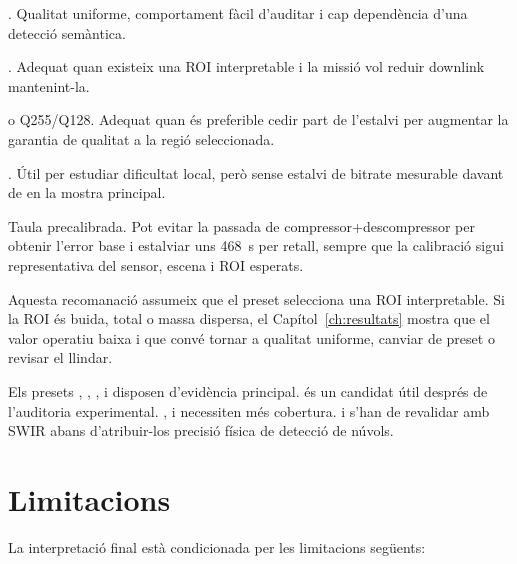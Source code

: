 \begin{description}[leftmargin=3.5cm,style=nextline]
  \item[Fallback robust] . Qualitat uniforme, comportament fàcil
  d'auditar i cap dependència d'una detecció semàntica.
  \item[Mode principal] . Adequat quan existeix
  una ROI interpretable i la missió vol reduir downlink mantenint-la.
  \item[ROI prioritària]  o Q255/Q128.
  Adequat quan és preferible cedir part de l'estalvi per augmentar la garantia
  de qualitat a la regió seleccionada.
  \item[Control tècnic] . Útil per estudiar dificultat local,
  però sense estalvi de bitrate mesurable davant de  en la mostra
  principal.
  \item[Baixa cadència o calibració coneguda] Taula precalibrada. Pot evitar la
  passada de compressor+descompressor per obtenir l'error base i estalviar uns
  468~s per retall, sempre que la calibració sigui representativa del sensor,
  escena i ROI esperats.
\end{description}

Aquesta recomanació assumeix que el preset selecciona una ROI interpretable. Si
la ROI és buida, total o massa dispersa, el Capítol~\ref{ch:resultats} mostra
que el valor operatiu baixa i que convé tornar a qualitat uniforme, canviar de
preset o revisar el llindar.

Els presets , , ,
 i  disposen d'evidència principal.
 és un candidat útil després de l'auditoria experimental.
,  i  necessiten més
cobertura.  i  s'han de revalidar amb SWIR
abans d'atribuir-los precisió física de detecció de núvols.

\section{Limitacions}\label{sec:final_limitations}

La interpretació final està condicionada per les limitacions següents:

